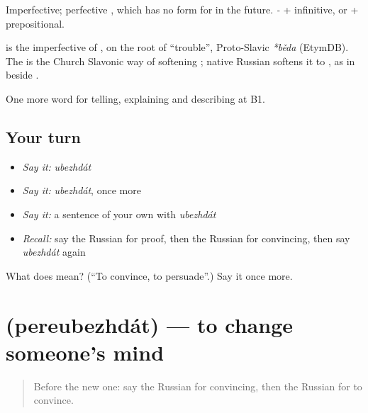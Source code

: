Imperfective; perfective \emph{}, which has no form for \emph{} in the future. \emph{ -} + infinitive, or \emph{} + prepositional.

\begin{cousinweb}
\textbf{} is the imperfective of \emph{}, on the root of \emph{} \textquotedblleft{}trouble\textquotedblright{}, Proto-Slavic \emph{*běda} (EtymDB). The \emph{} is the Church Slavonic way of softening \emph{}; native Russian softens it to \emph{}, as in \emph{} beside \emph{}.
\end{cousinweb}

\begin{grammarlens}[title={What you've built}]
One more word for telling, explaining and describing at B1.
\end{grammarlens}

\subsection*{Your turn}
\begin{itemize}
\raggedright
  \item \emph{Say it:} \emph{ubezhdát}
  \item \emph{Say it:} \emph{ubezhdát}, once more
  \item \emph{Say it:} a sentence of your own with \emph{ubezhdát}
  \item \emph{Recall:} say the Russian for proof, then the Russian for convincing, then say \emph{ubezhdát} again
\end{itemize}

\begin{tcolorbox}[breakable,colback=teal!4,colframe=teal!35!black,title={Before you move on}]
What does  mean? (\textquotedblleft{}To convince, to persuade\textquotedblright{}.) Say it once more.
\end{tcolorbox}
\section[\texorpdfstring{\ru{переубеждать} (pereubezhdát)}{переубеждать (pereubezhdát)}]{ (pereubezhdát) — to change someone’s mind}

\label{lesson:RU-C339-pereubezhdat}



\begin{quote}
Before the new one: say the Russian for convincing, then the Russian for to convince.
\end{quote}

